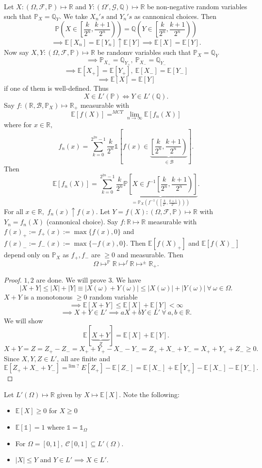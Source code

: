 \documentclass{article}
\newcommand{\1}{\mathds{1}}
\newcommand{\R}{\mathbb{R}}
\newcommand{\E}{\mathbb{E}}
\newcommand{\Q}{\mathbb{Q}}
\newcommand{\F}{\mathcal{F}}
\newcommand{\B}{\mathcal{B}}
\newcommand{\G}{\mathcal{G}}
\newcommand{\PB}{\mathbb{P}}
\newcommand{\lf}{\left}
\newcommand{\rg}{\right}
\newcommand{\f}[2]{\frac{#1}{#2}}
\newcommand{\C}{\mathcal{C}}
\newcommand{\fb}[1]{\lf(#1\rg)}
\newcommand{\tb}[1]{\lf[#1\rg]}
\newcommand{\card}[1]{\lf\vert #1\rg\vert}
\begin{document}
Let $X:(\Omega,\F,\PB)\mapsto\R$ and $Y:(\Omega',\G,\Q)\mapsto\R$ be non-negative random variables such that $\PB_X=\Q_Y.$ We take $X_n's$ and $Y_n's$ as cannonical choices. Then $$\PB\fb{X\in\lf[\f k{2^n},\f{k+1}{2^n}\rg)}=\Q\fb{Y\in\lf[\f k{2^n},\f{k+1}{2^n}\rg)}$$$$\implies \E[X_n]=\E[Y_n]\uparrow\E[Y]\implies \E[X]=\E[Y].$$ Now say $X,Y: (\Omega,\F,\PB)\mapsto\R$ be randomv variables such that $\PB_X=\Q_Y$ $$\implies \PB_{X_+}=\Q_{Y_+},\ \PB_{X_-}=\Q_{Y_-}$$ $$\implies\E[X_+]=\E[Y_+],\ \E[X_-]=\E[Y_-]$$ $$\implies \E[X]=\E[Y]$$ if one of them is well-defined. Thus $$X\in L'(\PB)\iff Y\in L'(\Q).$$ Say $f:(\R,\B,\PB_X)\mapsto\R_+$ measurable with $$\E[f(X)]=^{MCT}\lim_{n\to\infty}\E[f_n(X)]$$ where for $x\in\R,$ $$f_n(x)=\sum_{k=0}^{2^{2n}-1}\f k{2^n}\1\tb{f(x)\in \underbrace{\lf[\f k{2^n},\f{k+1}{2^n}\rg)}_{\in\B}}.$$ Then $$\E[f_n(X)]=\sum_{k=0}^{2^{2n}-1}\f k{2^n}\underbrace{\PB\tb{X\in f^{-1}\lf[\f k{2^n},\f{k+1}{2^n}\rg)}}_{=\PB_X\fb{f^{-1}\fb{\lf[\f k{2^n},\f{k+1}{2^n}\rg)}}}.$$ For all $x\in\R,$ $f_n(x)\uparrow f(x).$ Let $Y=f(X):(\Omega,\F,\PB)\mapsto\R$ with $Y_n=f_n(X)$ (cannonical choice). Say $f:\R\mapsto\R$ measurable with $f(x)_+:=f_+(x):=\max\{f(x),0\}$ and $f(x)_-:=f_-(x):=\max\{-f(x),0\}.$ Then $\E[f(X)_+]$ and $\E[f(X)_-]$ depend only on $\PB_X$ as $f_+,f_-$ are $\geq 0$ and measurable. Then $$\Omega\mapsto^\PB\R\mapsto^f\R\mapsto^\pm \R_+.$$ 
\begin{proof}
    $1,2$ are done. We will prove $3.$ We have $$\card{X+Y}\leq \card{X}+\card{Y}\equiv \card{X(\omega)+Y(\omega)}\leq \card{X(\omega)}+\card{Y(\omega)}\ \forall\ \omega\in\Omega.$$ 
    $X+Y$ is a monotonous $\geq 0$ random variable $$\implies\E[X+Y]\leq\E[X]+\E[Y]<\infty$$$$\implies X+Y\in L'\implies aX+bY\in L'\ \forall\ a,b\in\R.$$ We will show $$\E[\underbrace{X+Y}_Z]=\E[X]+\E[Y].$$ $$X+Y=Z=Z_+-Z_-=X_++Y_+-X_--Y_-=Z_++X_-+Y_-=X_++Y_++Z_-\geq 0.$$ Since $X,Y,Z\in L'$, all are finite and $$\E[Z_++X_-+Y_-]=^{\lim?}E[Z_+]-\E[Z_-]=\E[X_-]+\E[Y_+]-\E[X_-]-\E[Y_-].$$ 
    \end{proof}
    Let $L'(\Omega)\mapsto\R$ given by $X\mapsto\E[X].$ Note the following:
    \begin{itemize}
        \item $\E[X]\geq 0$ for $X\geq 0$
        \item $\E[\1]=1$ where $\1=\1_\Omega$
        \item For $\Omega=[0,1],\ \C[0,1]\subseteq L'(\Omega).$
        \item $\card{X}\leq Y$ and $Y\in L'\implies X\in L'.$        
    \end{itemize}
\end{document}
